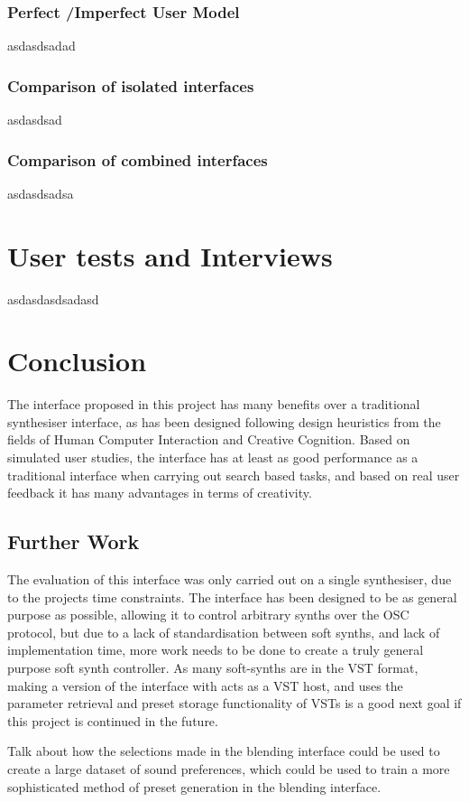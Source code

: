 \documentclass[11pt, oneside]{report}   	%
\begin{document}
\subsection{Perfect /Imperfect User Model}
asdasdsadad
\subsection{Comparison of isolated interfaces}
asdasdsad
\subsection{Comparison of combined interfaces}
asdasdsadsa

\chapter{User tests and Interviews}
asdasdasdsadasd

\chapter{Conclusion}
The interface proposed in this project has many benefits over a traditional synthesiser interface, as has been designed following design heuristics from the fields of Human Computer Interaction and Creative Cognition. Based on simulated user studies, the interface has at least as good performance as a traditional interface when carrying out search based tasks, and based on real user feedback it has many advantages in terms of creativity.
\section{Further Work}
The evaluation of this interface was only carried out on a single synthesiser, due to the projects time constraints. The interface has been designed to be as general purpose as possible, allowing it to control arbitrary synths over the OSC protocol, but due to a lack of standardisation between soft synths, and lack of implementation time, more work needs to be done to create a truly general purpose soft synth controller. As many soft-synths are in the VST format, making a version of the interface with acts as a VST host, and uses the parameter retrieval and preset storage functionality of VSTs is a good next goal if this project is continued in the future.

Talk about how the selections made in the blending interface could be used to create a large dataset of sound preferences, which could be used to train a more sophisticated method of preset generation in the blending interface.
\end{document}
